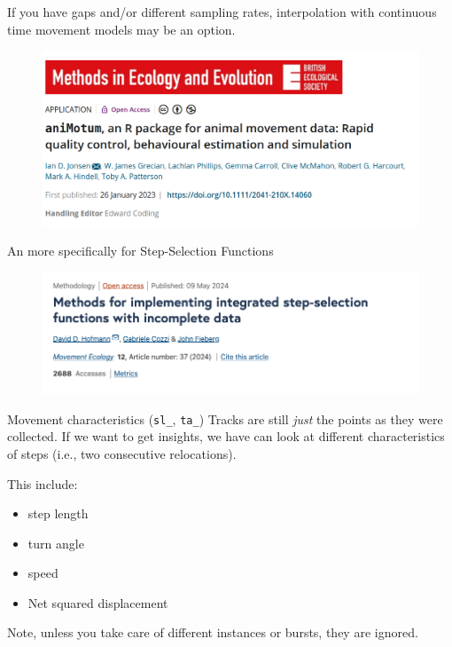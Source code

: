 \documentclass[ignorenonframetext,,t]{beamer}
\providecommand{\tightlist}{%
\setlength{\itemsep}{0pt}\setlength{\parskip}{0pt}}
\providecommand{\tightlist}{%
\setlength{\itemsep}{0pt}\setlength{\parskip}{0pt}}
\renewcommand{\tightlist}{\setlength{\itemsep}{1.4ex}\setlength{\parskip}{0pt}}
\begin{document}
\begin{frame}
If you have gaps and/or different sampling rates, interpolation with
continuous time movement models may be an option.

\begin{figure}

{\centering \includegraphics[width=0.85\linewidth]{../img/jonsen2023_mee} 

}

\end{figure}
\end{frame}

\begin{frame}
An more specifically for Step-Selection Functions

\begin{figure}

{\centering \includegraphics[width=0.85\linewidth]{../img/Hofmann2024} 

}

\end{figure}
\end{frame}

\begin{frame}{Movement characteristics (\texttt{sl\_}, \texttt{ta\_})}
\label{movement-characteristics-sl_-ta_}
Tracks are still \emph{just} the points as they were collected. If we
want to get insights, we have can look at different characteristics of
steps (i.e., two consecutive relocations).

This include:

\begin{itemize}
\tightlist
\item
  step length
\item
  turn angle
\item
  speed
\item
  Net squared displacement
\end{itemize}

Note, unless you take care of different instances or bursts, they are
ignored.
\end{frame}
\end{document}

